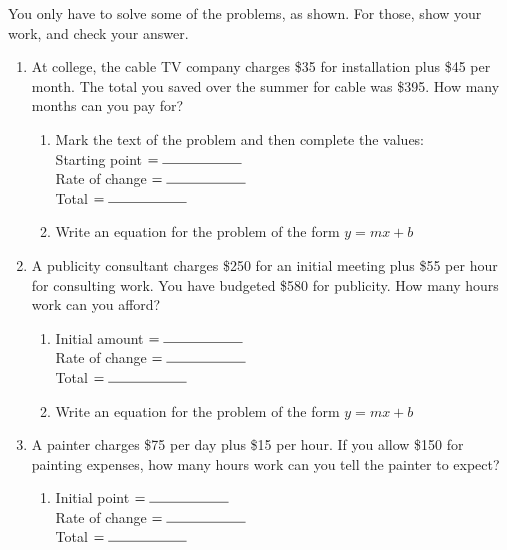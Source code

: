 \documentclass[12pt, oneside]{article}
\begin{document}
  You only have to solve some of the problems, as shown. For those, show your work, and check your answer.
  \begin{enumerate}
    \subsubsection*{Classwork: Word problem Wednesday}

  \item At college, the cable TV company charges \$35 for installation plus \$45 per month. The total you saved over the summer for cable was \$395. How many months can you pay for?
  \begin{enumerate}
    \item Mark the text of the problem and then complete the values:\\[0.5cm]
    Starting point $= \rule{2cm}{0.15mm}$ \\[0.5cm]
    Rate of change $= \rule{2cm}{0.15mm}$ \\[0.5cm]
    Total $= \rule{2cm}{0.15mm}$ \\

    \item Write an equation for the problem of the form $y=mx+b$\\[3cm]

  \end{enumerate}

  \item A publicity consultant charges \$250 for an initial meeting plus \$55 per hour for consulting work. You have budgeted \$580 for publicity. How many hours work can you afford?
  \begin{enumerate}
    \item Initial amount $= \rule{2cm}{0.15mm}$ \\[0.5cm]
    Rate of change $= \rule{2cm}{0.15mm}$ \\[0.5cm]
    Total $= \rule{2cm}{0.15mm}$ \\

    \item Write an equation for the problem of the form $y=mx+b$\\[1.5cm]
  \end{enumerate}

\newpage

  \item A painter charges \$75 per day plus \$15 per hour. If you allow \$150 for painting expenses, how many hours work can you tell the painter to expect?
  \begin{enumerate}
    \item Initial point $= \rule{2cm}{0.15mm}$ \\[0.5cm]
    Rate of change $= \rule{2cm}{0.15mm}$ \\[0.5cm]
    Total $= \rule{2cm}{0.15mm}$ \\


\end{enumerate}
\end{enumerate}
\end{document}

